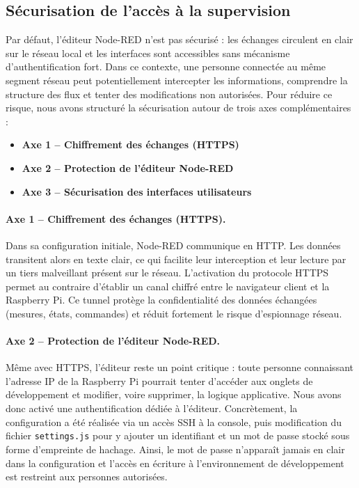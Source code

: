     \subsection{Sécurisation de l'accès à la supervision}
        Par défaut, l'éditeur Node-RED n'est pas sécurisé : les échanges circulent en clair sur le réseau local et les interfaces sont accessibles sans mécanisme d'authentification fort. Dans ce contexte, une personne connectée au même segment réseau peut potentiellement intercepter les informations, comprendre la structure des flux et tenter des modifications non autorisées. Pour réduire ce risque, nous avons structuré la sécurisation autour de trois axes complémentaires :
        \begin{itemize}
            \item \textbf{Axe 1 -- Chiffrement des échanges (HTTPS)}
            \item \textbf{Axe 2 -- Protection de l'éditeur Node-RED}
            \item \textbf{Axe 3 -- Sécurisation des interfaces utilisateurs}
        \end{itemize}

        \paragraph{Axe 1 -- Chiffrement des échanges (HTTPS).}
        Dans sa configuration initiale, Node-RED communique en HTTP. Les données transitent alors en texte clair, ce qui facilite leur interception et leur lecture par un tiers malveillant présent sur le réseau. L'activation du protocole HTTPS permet au contraire d'établir un canal chiffré entre le navigateur client et la Raspberry Pi. Ce tunnel protège la confidentialité des données échangées (mesures, états, commandes) et réduit fortement le risque d'espionnage réseau.

        \paragraph{Axe 2 -- Protection de l'éditeur Node-RED.}
        Même avec HTTPS, l'éditeur reste un point critique : toute personne connaissant l'adresse IP de la Raspberry Pi pourrait tenter d'accéder aux onglets de développement et modifier, voire supprimer, la logique applicative. Nous avons donc activé une authentification dédiée à l'éditeur. Concrètement, la configuration a été réalisée via un accès SSH à la console, puis modification du fichier \texttt{settings.js} pour y ajouter un identifiant et un mot de passe stocké sous forme d'empreinte de hachage. Ainsi, le mot de passe n'apparaît jamais en clair dans la configuration et l'accès en écriture à l'environnement de développement est restreint aux personnes autorisées.

